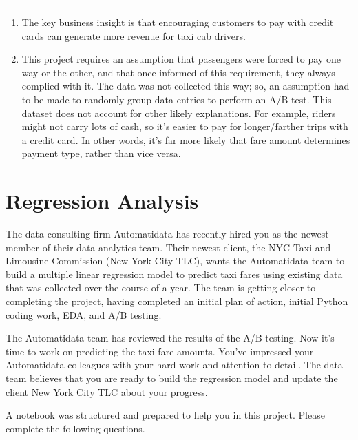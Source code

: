 \documentclass[letterpaper,10pt,english]{sphinxmanual}
\begin{document}
\bigskip\hrule\bigskip

\begin{enumerate}
%
\item {} 
\sphinxAtStartPar
The key business insight is that encouraging customers to pay with credit cards can generate more revenue for taxi cab drivers.

\item {} 
\sphinxAtStartPar
This project requires an assumption that passengers were forced to pay one way or the other, and that once informed of this requirement, they always complied with it. The data was not collected this way; so, an assumption had to be made to randomly group data entries to perform an A/B test. This dataset does not account for other likely explanations. For example, riders might not carry lots of cash, so it’s easier to pay for longer/farther trips with a credit card. In other words, it’s far more likely that fare amount determines payment type, rather than vice versa.

\end{enumerate}

\sphinxstepscope


\chapter{Regression Analysis}
\label{\detokenize{Automatidata_Regression Analysis:regression-analysis}}\label{\detokenize{Automatidata_Regression Analysis::doc}}
\sphinxAtStartPar
The data consulting firm Automatidata has recently hired you as the newest member of their data analytics team. Their newest client, the NYC Taxi and Limousine Commission (New York City TLC), wants the Automatidata team to build a multiple linear regression model to predict taxi fares using existing data that was collected over the course of a year. The team is getting closer to completing the project, having completed an initial plan of action, initial Python coding work, EDA, and A/B testing.

\sphinxAtStartPar
The Automatidata team has reviewed the results of the A/B testing. Now it’s time to work on predicting the taxi fare amounts. You’ve impressed your Automatidata colleagues with your hard work and attention to detail. The data team believes that you are ready to build the regression model and update the client New York City TLC about your progress.

\sphinxAtStartPar
A notebook was structured and prepared to help you in this project. Please complete the following questions.
\end{document}
